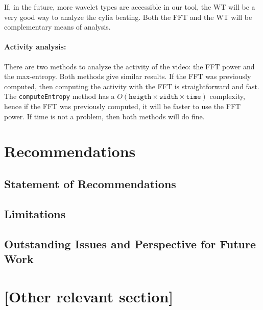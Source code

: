 \documentclass[11pt]{scrartcl}
\begin{document}
If, in the future, more wavelet types are accessible in our tool, the WT will be a very good way to
analyze the cylia beating. Both the FFT and the WT will be complementary means of analysis.


\paragraph{Activity analysis:}

There are two methods to analyze the activity of the video: the FFT power and the max-entropy. Both methods
give similar results. If the FFT was previously computed, then computing the activity with the FFT is
straightforward and fast. The \texttt{computeEntropy} method has a $O(\mathtt{heigth} \times \mathtt{width}
\times \mathtt{time})$ complexity, hence if the FFT was previously computed, it will be faster to use the FFT
power. If time is not a problem, then both methods will do fine.



\section{Recommendations}


\subsection{Statement of Recommendations}


\subsection{Limitations}


\subsection{Outstanding Issues and Perspective for Future Work}




\section{[Other relevant section]}








\end{document}
